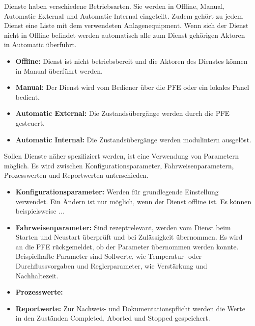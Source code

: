 Dienste haben verschiedene Betriebsarten. Sie werden in Offline, Manual, Automatic External und Automatic Internal eingeteilt. Zudem gehört zu jedem Dienst eine Liste mit dem verwendeten Anlagenequipment. Wenn sich der Dienst nicht in Offline befindet werden automatisch alle zum Dienst gehörigen Aktoren in Automatic überführt.
\begin{itemize}
\item \textbf{Offline:} Dienst ist nicht betriebsbereit und die Aktoren des Dienstes können in Manual überführt werden.
\item \textbf{Manual:} Der Dienst wird vom Bediener über die PFE oder ein lokales Panel bedient.
\item \textbf{Automatic External:} Die Zustandsübergänge werden durch die PFE gesteuert.
\item \textbf{Automatic Internal:} Die Zustandsübergänge werden modulintern ausgelöst.
\end{itemize}

Sollen Dienste näher spezifiziert werden, ist eine Verwendung von Parametern möglich. Es wird zwischen Konfigurationsparameter, Fahrweisenparametern, Prozesswerten und Reportwerten unterschieden.
\begin{itemize}
\item \textbf{Konfigurationsparameter:} Werden für grundlegende Einstellung verwendet. Ein Ändern ist nur möglich, wenn der Dienst offline ist. Es können beispielsweise ...
\item \textbf{Fahrweisenparameter:} Sind rezeptrelevant, werden vom Dienst beim Starten und Neustart überprüft und bei Zulässigkeit übernommen. Es wird an die PFE rückgemeldet, ob der Parameter übernommen werden konnte. Beispielhafte Parameter sind Sollwerte, wie Temperatur- oder Durchflussvorgaben und Reglerparameter, wie Verstärkung und Nachhaltezeit.
\item \textbf{Prozesswerte:} 
\item \textbf{Reportwerte:} Zur Nachweis- und Dokumentationspflicht werden die Werte in den Zuständen Completed, Aborted und Stopped gespeichert.
\end{itemize}

